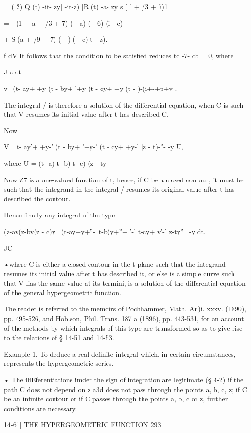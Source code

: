 = ( 2) Q (t) -it- zy] -it-z) [R (t) -a- zy s ( ' + /3 + 7)1

= - (1 + a + /3 + 7) ( - a) ( - 6) (i - c)

+ S (a + /9 + 7) ( - ) ( - c) t - z).

f dV It follows that the condition to be satisfied reduces to -7- dt =
0, where

J c dt

v=(t- ay+ +y (t - by+ '+y (t - cy+ +y (t - )-(i+-+p+v .

The integral / is therefore a solution of the differential equation,
when C is such that V resumes its initial value after t has described
C.

Now

V= t- ay'+ +y-' (t - by+ '+y-' (t - cy+ +y-' [z - t)-''- -y U,

where U = (t- a) t -b) t- c) (z - ty\

Now Z7 is a one-valued function of t; hence, if C be a closed
contour, it must be such that the integrand in the integral / resumes
its original value after t has described the contour.

Hence finally any integral of the type

(z-ay(z-by(z - c)y \ (t-ay+y+''-\ t-b)y+''+ '-' t-cy+ y'-' z-ty''~ -y
dt,

JC

•where C is either a closed contour in the t-plane such that the
integrand resumes its initial value after t has described it, or else
is a simple curve such that V lias the same value at its termini, is a
solution of the differential equation of the general hypergeometric
function.

The reader is referred to the memoirs of Pochhammer, Math. An)i. xxxv.
(1890), pp. 495-526, and Hob.son, Phil. Trans. 187 a (1896), pp.
443-531, for an account of the methods by which integrals of this type
are transformed so as to give rise to the relations of § 14-51 and
14-53.

Example 1. To deduce a real definite integral which, in certain
circumstances, represents the hypergeometric series.

• The iliEferentiations imder the sign of integration are legitimate
(§ 4-2) if the path C does not depend on z a3d does not pass through
the points a, b, c, z; if C be an infinite contour or if C passes
through the points a, b, c or z, further conditions are necessary.

14-61] THE HYPERGEOMETRIC FUNCTION 293

